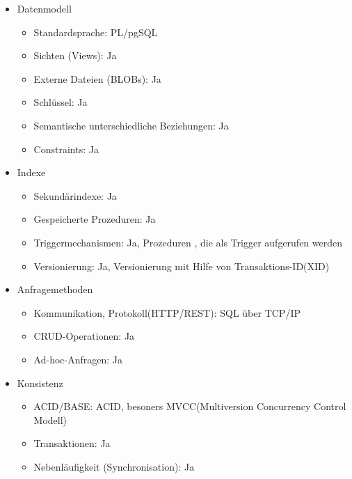 \begin{itemize}
        \item Datenmodell
        \begin{itemize}
            \item Standardsprache: PL/pgSQL %
            \item Sichten (Views): Ja
            \item Externe Dateien (BLOBs): Ja
            \item Schlüssel: Ja
            \item Semantische unterschiedliche Beziehungen: Ja
            \item Constraints: Ja
        \end{itemize}
        \item Indexe
        \begin{itemize}
            \item Sekundärindexe: Ja
            \item Gespeicherte Prozeduren: Ja
            \item Triggermechanismen: Ja, Prozeduren , die als Trigger aufgerufen werden %
            \item Versionierung: Ja, Versionierung mit Hilfe von Transaktions-ID(XID) %
        \end{itemize}
        \item Anfragemethoden
        \begin{itemize}
            \item Kommunikation, Protokoll(HTTP/REST): SQL über TCP/IP
            \item CRUD-Operationen: Ja
            \item Ad-hoc-Anfragen: Ja
        \end{itemize}
        \item Konsistenz
        \begin{itemize}
            \item ACID/BASE: ACID, besoners MVCC(Multiversion Concurrency Control Modell)
            \item Transaktionen: Ja
            \item Nebenläufigkeit (Synchronisation): Ja

\end{itemize}
\end{itemize}
